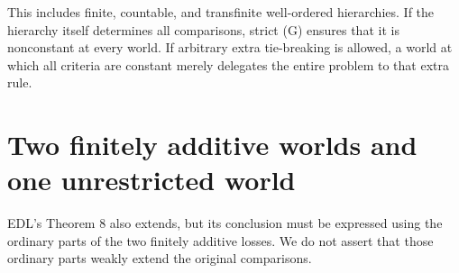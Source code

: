 \documentclass[11pt]{article}
\theoremstyle{remark}\newtheorem{remark}[theorem]{Remark}
\begin{document}
This includes finite, countable, and transfinite well-ordered hierarchies.
If the hierarchy itself determines all comparisons, strict (G) ensures
that it is nonconstant at every world. If arbitrary extra tie-breaking is
allowed, a world at which all criteria are constant merely delegates the
entire problem to that extra rule.

\section{Two finitely additive worlds and one unrestricted world}

EDL's Theorem 8 also extends, but its conclusion must be expressed using
the ordinary parts of the two finitely additive losses. We do not assert
that those ordinary parts weakly extend the original comparisons.
\end{document}
